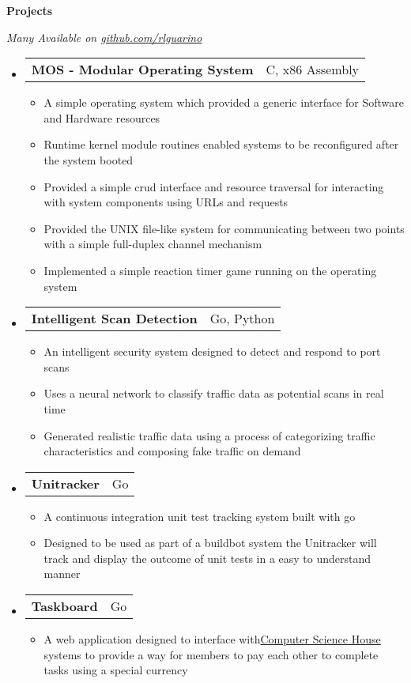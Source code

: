 \documentclass[letterpaper,11pt]{article}
\makeatletter
\newcommand{\resheading}[1]{{\large \colorbox{mygrey}{\begin{minipage}{\textwidth}{\textbf{#1 \vphantom{p\^{E}}}}\end{minipage}}}}
\newcommand{\restwosubheading}[2]{
\begin{tabular*}{6.5in}{l@{\extracolsep{\fill}}r}
    \textbf{#1} & #2 \\
\end{tabular*}\vspace{-6pt}}
\makeatother
\begin{document}
\resheading{Projects}
  \footnotesize
  \textit{Many Available on {\href{http://www.github.com/rlguarino/}{github.com/rlguarino}}}
  \begin{itemize}
    \item
      \restwosubheading{MOS - Modular Operating System}{C, x86 Assembly}
      \begin{itemize}
        \item{A simple operating system which provided a generic interface for Software and Hardware resources}
        \item{Runtime kernel module routines enabled systems to be reconfigured after the system booted}
        \item{Provided a simple crud interface and resource traversal for interacting with system components using URLs and requests}
        \item{Provided the UNIX file-like system for communicating between two points with a simple full-duplex channel mechanism}
        \item{Implemented a simple reaction timer game running on the operating system}
      \end{itemize}
    \item
      \restwosubheading{Intelligent Scan Detection}{Go, Python}
      \begin{itemize}
        \item{An intelligent security system designed to detect and respond to port scans}
        \item{Uses a neural network to classify traffic data as potential scans in real time}
        \item{Generated realistic traffic data using a process of categorizing traffic characteristics and composing fake traffic on demand}
      \end{itemize}
   \item
     \restwosubheading{Unitracker}{Go}
     \begin{itemize}
  \item{A continuous integration unit test tracking system built with go}
  \item{Designed to be used as part of a buildbot system the Unitracker will track and display the outcome of unit tests in a easy to understand manner}
     \end{itemize}
    \item
      \restwosubheading{Taskboard}{Go}
      \begin{itemize}
  \item{A web application designed to interface with{\href{http://csh.rit.edu}{Computer Science House} } systems to provide a way for members to pay each other to complete tasks using a special currency}

\end{itemize}
\end{itemize}
\end{document}
